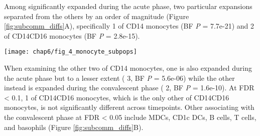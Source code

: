 Among \subcommunities{} significantly expanded during the acute phase, two particular expansions separated from the others by an order of magnitude (Figure \ref{fig:subcomm_diffs}A), specifically \subcommunity{} 1 of CD14\sups{+} monocytes (BF \emph{P} = 7.7e-21) and \subcommunity{} 2 of CD14\sups{+}\allowbreak CD16\sups{+} monocytes (BF \emph{P} = 2.8e-15).
\begin{figure*}[htb]
  \centering
  \texttt{[image: chap6/fig\_4\_monocyte\_subpops]}
  \caption[Marker expression differences between sub-communities of CD14\sups{+}CD16\sups{+} monocytes and CD14\sups{+} monocytes]{
  \textbf{Marker expression differences between sub-communities of CD14\sups{+}CD16\sups{+} monocytes and CD14\sups{+} monocytes}, depicted as boxplots of the mean expression levels for all samples. A, relative expression of CD14\sups{+} and CD16\sups{+} in CD14\sups{+}CD16\sups{+} sub-communities indicates that sub-community 1 is a CD14\sups{+}CD16\sups{++} (aka “non-classical”) phenotype, while sub-community 2 is a CD14\sups{++}CD16\sups{+} (aka “intermediate”) phenotype. Differences shown here are significant at FDR < 0.05; for a view of all differences significant at this threshold, see Appendix Figure \ref{fig:cd14cd16_channel_diffs}. B, relative expression of six markers that most differentiate (by the difference in medians) sub-community 1 of CD14\sups{+} monocytes from the other sub-communities. C, relative expression of six markers that most differentiate (by the difference in medians) sub-community 3 of CD14\sups{+} monocytes from the other sub-communities. Note: Channels shown in B and C are a subset of the differences that are significant at FDR < 0.05; for a view of all differences significant at FDR < 0.05 see Appendix Figure \ref{fig:cd14_channel_diffs}.
  }
  \label{fig:subcomm_marker_diffs}
\end{figure*}
When examining the other two \subcommunities{} of CD14\sups{+} monocytes, one is also expanded during the acute phase but to a lesser extent (\subcommunity{} 3, BF \emph{P} = 5.6e-06) while the other instead is expanded during the convalescent phase (\subcommunity{} 2, BF \emph{P} = 1.6e-10). At FDR < 0.1, \subcommunity{} 1 of CD14\sups{+}\allowbreak CD16\sups{+} monocytes, which is the only other \subcommunity{} of CD14\sups{+}\allowbreak CD16\sups{+} monocytes, is not significantly different across timepoints. Other \subcommunities{} associating with the convalescent phase at FDR < 0.05 include MDCs, CD1c DCs, B cells, T cells, and basophils (Figure \ref{fig:subcomm_diffs}B).

